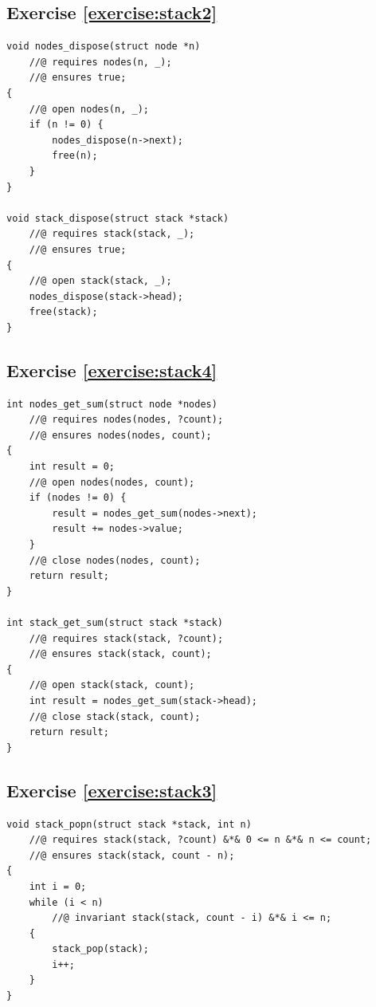 \documentclass{article}
\begin{document}
\subsection{Exercise
\ref{exercise:stack2}}\label{solution:stack2}

\begin{lstlisting}
void nodes_dispose(struct node *n)
    //@ requires nodes(n, _);
    //@ ensures true;
{
    //@ open nodes(n, _);
    if (n != 0) {
        nodes_dispose(n->next);
        free(n);
    }
}

void stack_dispose(struct stack *stack)
    //@ requires stack(stack, _);
    //@ ensures true;
{
    //@ open stack(stack, _);
    nodes_dispose(stack->head);
    free(stack);
}
\end{lstlisting}

\subsection{Exercise
\ref{exercise:stack4}}\label{solution:stack4}

\begin{lstlisting}
int nodes_get_sum(struct node *nodes)
    //@ requires nodes(nodes, ?count);
    //@ ensures nodes(nodes, count);
{
    int result = 0;
    //@ open nodes(nodes, count);
    if (nodes != 0) {
        result = nodes_get_sum(nodes->next);
        result += nodes->value;
    }
    //@ close nodes(nodes, count);
    return result;
}

int stack_get_sum(struct stack *stack)
    //@ requires stack(stack, ?count);
    //@ ensures stack(stack, count);
{
    //@ open stack(stack, count);
    int result = nodes_get_sum(stack->head);
    //@ close stack(stack, count);
    return result;
}
\end{lstlisting}

\subsection{Exercise
\ref{exercise:stack3}}\label{solution:stack3}

\begin{lstlisting}
void stack_popn(struct stack *stack, int n)
    //@ requires stack(stack, ?count) &*& 0 <= n &*& n <= count;
    //@ ensures stack(stack, count - n);
{
    int i = 0;
    while (i < n)
        //@ invariant stack(stack, count - i) &*& i <= n;
    {
        stack_pop(stack);
        i++;
    }
}
\end{lstlisting}
\end{document}
